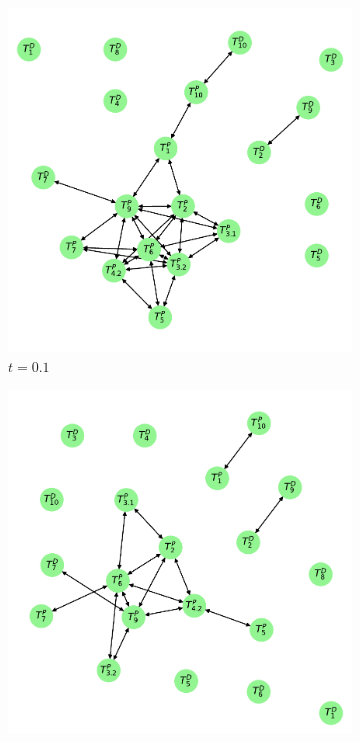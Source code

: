 \documentclass[../Thesis.tex]{subfiles}
\begin{document}
\begin{figure}[ht]
    \centering
    \begin{subfigure}[t]{0.43\linewidth}
        \includegraphics[width = \linewidth]{figures/Cycle data/G_dir times as graph - symmetric - 0_1.pdf}
        \caption{$t=0.1$}
        \label{subfig:G_dir times - graph - t 0.1}
    \end{subfigure}
    \hfill
    \begin{subfigure}[t]{0.43\linewidth}
        \includegraphics[width = \linewidth]{figures/Cycle data/G_dir times as graph - symmetric - 0_118.pdf}

\end{subfigure}
\end{figure}
\end{document}
